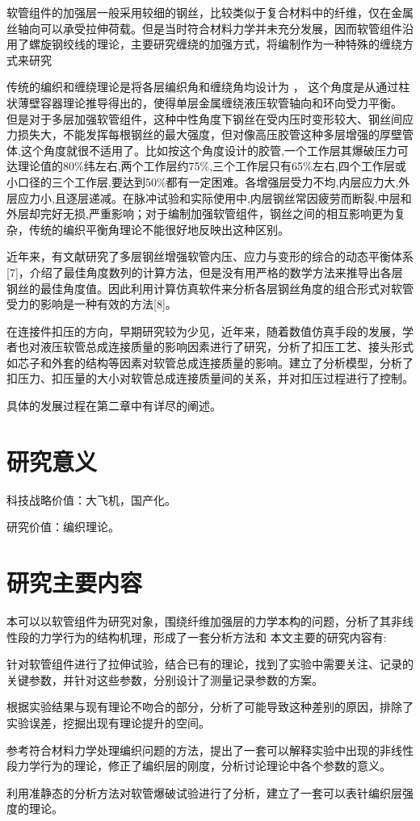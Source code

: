 软管组件的加强层一般采用较细的钢丝，比较类似于复合材料中的纤维，仅在金属丝轴向可以承受拉伸荷载。但是当时符合材料力学并未充分发展，因而软管组件沿用了螺旋钢绞线的理论，主要研究缠绕的加强方式\cite{Entwistle1977,Knapp1979}，将编制作为一种特殊的缠绕方式来研究\cite{Breig1988}

传统的编织和缠绕理论是将各层编织角和缠绕角均设计为 ，
这个角度是从通过柱状薄壁容器理论推导得出的，使得单层金属缠绕液压软管轴向和环向受力平衡。
但是对于多层加强软管组件，这种中性角度下钢丝在受内压时变形较大、钢丝间应力损失大\cite{Evans2002}，不能发挥每根钢丝的最大强度，但对像高压胶管这种多层增强的厚壁管体,这个角度就很不适用了。比如按这个角度设计的胶管,一个工作层其爆破压力可达理论值的80\%纬左右,两个工作层约75\%,三个工作层只有65\%左右,四个工作层或小口径的三个工作层,要达到50\%都有一定困难。各增强层受力不均,内层应力大,外层应力小,且逐层递减。在脉冲试验和实际使用中,内层钢丝常因疲劳而断裂,中层和外层却完好无损,严重影响；对于编制加强软管组件，钢丝之间的相互影响更为复杂，传统的编织平衡角理论不能很好地反映出这种区别。

近年来，有文献研究了多层钢丝增强软管内压、应力与变形的综合的动态平衡体系[7]，介绍了最佳角度数列的计算方法，但是没有用严格的数学方法来推导出各层钢丝的最佳角度值。因此利用计算仿真软件来分析各层钢丝角度的组合形式对软管受力的影响是一种有效的方法[8]。 

在连接件扣压的方向，早期研究较为少见，近年来，随着数值仿真手段的发展，学者也对液压软管总成连接质量的影响因素进行了研究，分析了扣压工艺、接头形式如芯子和外套的结构等因素对软管总成连接质量的影响。建立了分析模型，分析了扣压力、扣压量的大小对软管总成连接质量间的关系，并对扣压过程进行了控制。

具体的发展过程在第二章中有详尽的阐述。


\section{研究意义}

科技战略价值：大飞机，国产化。

研究价值：编织理论。

\section{研究主要内容}
本可以以软管组件为研究对象，围绕纤维加强层的力学本构的问题，分析了其非线性段的力学行为的结构机理，形成了一套分析方法和
本文主要的研究内容有:
\begin{asparaenum}
	\item 针对软管组件进行了拉伸试验，结合已有的理论，找到了实验中需要关注、记录的关键参数，并针对这些参数，分别设计了测量记录参数的方案。
	\item 根据实验结果与现有理论不吻合的部分，分析了可能导致这种差别的原因，排除了实验误差，挖掘出现有理论提升的空间。
	\item 参考符合材料力学处理编织问题的方法，提出了一套可以解释实验中出现的非线性段力学行为的理论，修正了编织层的刚度，分析讨论理论中各个参数的意义。
	 \item 
	利用准静态的分析方法对软管爆破试验进行了分析，建立了一套可以表针编织层强度的理论。
\end{asparaenum}

 
